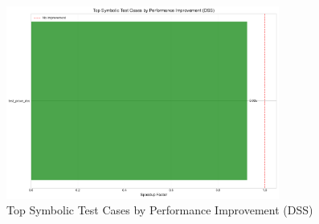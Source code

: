 \documentclass[article]{article}
\begin{document}
\begin{figure}[H]
\centering
\includegraphics[width=0.8\textwidth]{charts/symbolic_dss_test_case_improvement.pdf}
\caption{Top Symbolic Test Cases by Performance Improvement (DSS)}
\label{fig:symbolic_dss_test_case_improvement}
\end{figure}

\newpage
\end{document}
